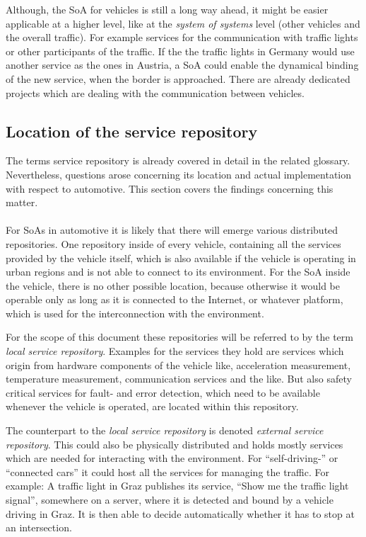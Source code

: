 Although, the SoA for vehicles is still a long way ahead, it might be easier applicable at a higher level, like at the \emph{system of systems} level (other vehicles and the overall traffic). For example services for the communication with traffic lights or other participants of the traffic. If the the traffic lights in Germany would use another service as the ones in Austria, a SoA could enable the dynamical binding of the new service, when the border is approached. There are already dedicated projects which are dealing with the communication between vehicles.


\subsection{Location of the service repository}
The terms service repository is already covered in detail in the related glossary. Nevertheless, questions arose concerning its location and actual implementation with respect to automotive. This section covers the findings concerning this matter.
\\
\\
For SoAs in automotive it is likely that there will emerge various distributed repositories. One repository inside of every vehicle, containing all the services provided by the vehicle itself, which is also available if the vehicle is operating in urban regions and is not able to connect to its environment. For the SoA inside the vehicle, there is no other possible location, because otherwise it would be operable only as long as it is connected to the Internet, or whatever platform, which is used for the interconnection with the environment.

For the scope of this document these repositories will be referred to by the term \emph{local service repository}. Examples for the services they hold are services which origin from hardware components of the vehicle like, acceleration measurement, temperature measurement, communication services and the like. But also safety critical services for fault- and error detection, which need to be available whenever the vehicle is operated, are located within this repository.

The counterpart to the \emph{local service repository} is denoted \emph{external service repository}. This could also be physically distributed and holds mostly services which are needed for interacting with the environment. For ``self-driving-'' or ``connected cars'' it could host all the services for managing the traffic. For example: A traffic light in Graz publishes its service, ``Show me the traffic light signal'', somewhere on a server, where it is detected and bound by a vehicle driving in Graz. It is then able to decide automatically whether it has to stop at an intersection.

